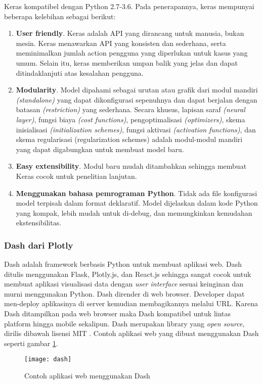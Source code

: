 \documentclass[../thesis.tex]{subfiles}
\begin{document}
Keras kompatibel dengan Python 2.7-3.6. Pada penerapannya, keras mempunyai beberapa
kelebihan sebagai berikut:
\begin{enumerate}
	\item \textbf{User friendly}. Keras adalah API yang dirancang untuk manusia, bukan mesin. Keras menawarkan API yang konsisten dan sederhana, serta meminimalkan jumlah action
	pengguna yang diperlukan untuk kasus yang umum. Selain itu, keras memberikan umpan balik yang jelas dan dapat ditindaklanjuti atas kesalahan pengguna.
	\item \textbf{Modularity}. Model dipahami sebagai urutan atau grafik dari modul mandiri \textit{(standalone)}
	yang dapat dikonfigurasi sepenuhnya dan dapat berjalan dengan batasan \textit{(restriction)} yang sederhana. Secara khusus, lapisan saraf \textit{(neural layer)}, fungsi biaya \textit{(cost functions)}, pengoptimalisasi \textit{(optimizers)}, skema inisialisasi \textit{(initialization schemes)}, fungsi aktivasi
	\textit{(activation functions)}, dan skema regularisasi (regularization schemes) adalah modul-modul mandiri yang dapat digabungkan untuk membuat model baru.
	\item \textbf{Easy extensibility}. Modul baru mudah ditambahkan sehingga membuat Keras cocok untuk penelitian lanjutan.
	\item \textbf{Menggunakan bahasa pemrograman Python}. Tidak ada file konfigurasi model
	terpisah dalam format deklaratif. Model dijelaskan dalam kode Python yang kompak,
	lebih mudah untuk di-debug, dan memungkinkan kemudahan ekstensibilitas.
\end{enumerate}

\subsubsection{Dash dari Plotly}
Dash adalah framework berbasis Python untuk membuat aplikasi web. Dash ditulis menggunakan Flask, Plotly.js, dan React.js sehingga sangat cocok untuk membuat aplikasi visualisasi data dengan \textit{user interface} sesuai keinginan dan murni menggunakan Python. 
Dash dirender di web browser. Developer dapat men-deploy aplikasinya di server kemudian membagikannya melalui URL. Karena Dash ditampilkan pada web browser maka Dash kompatibel untuk lintas platform hingga mobile sekalipun. 
Dash merupakan library yang \textit{open source}, dirilis dibawah lisensi MIT \cite{Dash}. Contoh aplikasi web yang dibuat menggunakan Dash seperti gambar \ref{Dash}.

\begin{figure}[htp]
	\centering
	\texttt{[image: dash]}
	\caption{Contoh aplikasi web menggunakan Dash}
	\label{Dash}
\end{figure}
\end{document}
